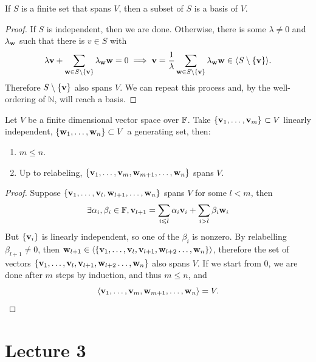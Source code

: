 \documentclass[a4paper]{article}
\begin{document}
\begin{lemma}
    If $S$ is a finite set that spans $V$, then a subset of $S$ is a basis of $V$.
\end{lemma}
\begin{proof}
    If $S$ is independent, then we are done.
    Otherwise, there is some $\lambda\neq 0$ and $\lambda_{\bf w}$ such that there is $v\in S$ with
    $$\lambda {\bf v}+\sum_{{\bf w}\in S\setminus\{{\bf v}\}}\lambda_{\bf w}{\bf w}=0\implies {\bf v}=\frac{1}{\lambda}\sum_{{\bf w}\in S\setminus\{{\bf v}\}}\lambda_{\bf w}{\bf w}\in\langle S\setminus\{{\bf v}\}\rangle.$$
    Therefore $S\setminus\{{\bf v}\}$ also spans $V$.
    We can repeat this process and, by the well-ordering of $\mathbb N$, will reach a basis.
\end{proof}
\begin{theorem}\label{thm:steinitz}
    Let $V$ be a finite dimensional vector space over ${\mathbb{F}}$. Take $\{{\bf v}_1,\ldots,{\bf v}_m\}\subset V$ linearly independent, $\{{\bf w}_1,\ldots,{\bf w}_n\}\subset V$ a generating set, then:
    \begin{enumerate}
        \item $m\le n$.
        \item Up to relabeling, $\{{\bf v}_1,\ldots,{\bf v}_m,{\bf w}_{m+1},\ldots,{\bf w}_n\}$ spans $V$.
    \end{enumerate}
\end{theorem}
\begin{proof}
    Suppose $\{{\bf v}_1,\ldots,{\bf v}_l,{\bf w}_{l+1},\ldots,{\bf w}_n\}$ spans $V$ for some $l<m$, then
    $$\exists\alpha_i,\beta_i\in {\mathbb{F}}, {\bf v}_{l+1}=\sum_{i\leqslant l}\alpha_i{\bf v}_i+\sum_{i>l}\beta_i{\bf w}_i$$
    But $\{{\bf v}_i\}$ is linearly independent, so one of the $\beta_i$ is nonzero.
    By relabelling $\beta_{l+1}\neq 0$, then ${\bf w}_{l+1}\in\langle\{{\bf v}_1,\ldots,{\bf v}_l,{\bf v}_{l+1},{\bf w}_{l+2}\ldots,{\bf w}_n\}\rangle$, therefore the set of vectors $\{{\bf v}_1,\ldots,{\bf v}_l,{\bf v}_{l+1},{\bf w}_{l+2}\ldots,{\bf w}_n\}$ also spans $V$. If we start from 0, we are done after $m$ steps by induction, and thus $m\le n$, and
    \[
        \langle {\bf v}_1,\ldots,{\bf v}_m,{\bf w}_{m+1},\ldots,{\bf w}_n \rangle =V.\qedhere
    \]
\end{proof}
\newpage 
\part*{Lecture 3}
\end{document}
